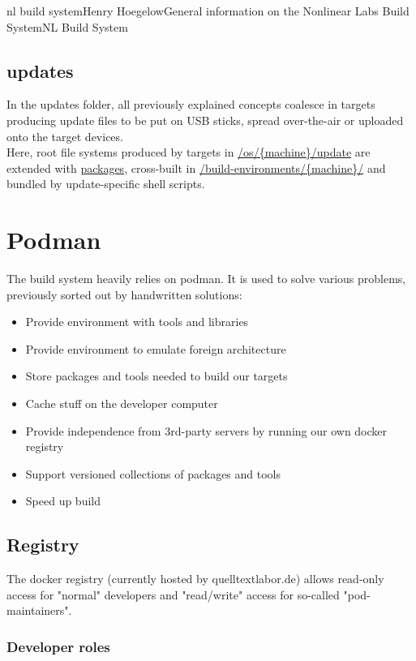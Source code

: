 \documentclass[11pt]{article}
\begin{document}
\begin{Name}{1}{nl build system}{Henry Hoegelow}{General information on the Nonlinear Labs Build System}{NL Build System}
\subsection{updates}
In the updates folder, all previously explained concepts coalesce in targets producing update files to be put on USB sticks, spread over-the-air or uploaded onto the target devices.\\
Here, root file systems produced by targets in \hyperref[os-update]{/os/\{machine\}/update} are extended with \hyperref[packages]{packages}, cross-built in \hyperref[buildenv]{/build-environments/\{machine\}/} and bundled by update-specific shell scripts.

\section{Podman} \label{pod}
The build system heavily relies on podman. It is used to solve various problems, previously sorted out by handwritten solutions:
\begin{itemize}
\item Provide environment with tools and libraries
\item Provide environment to emulate foreign architecture
\item Store packages and tools needed to build our targets
\item Cache stuff on the developer computer
\item Provide independence from 3rd-party servers by running our own docker registry
\item Support versioned collections of packages and tools
\item Speed up build
\end{itemize}

\subsection{Registry}
The docker registry (currently hosted by quelltextlabor.de) allows read-only access for "normal" developers and "read/write" access for so-called "pod-maintainers".

\subsubsection{Developer roles}

\end{Name}
\end{document}
